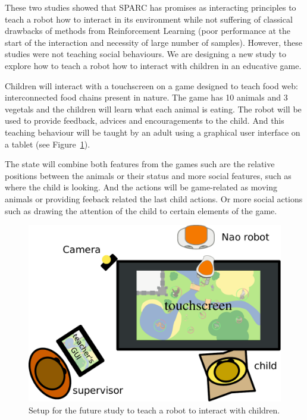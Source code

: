 \documentclass[conference]{IEEEtran}
\begin{document}
These two studies showed that SPARC has promises as interacting principles to
teach a robot how to interact in its environment while not suffering of
classical drawbacks of methods from Reinforcement Learning (poor performance at
the start of the interaction and necessity of large number of samples). However,
these studies were not teaching social behaviours. We are designing a new study
to explore how to teach a robot how to interact with children in an educative
game. 

Children will interact with a touchscreen on a game designed to teach food web:
interconnected food chains present in nature. The game has 10 animals and 3
vegetals and the children will learn what each animal is eating.
The robot will be used to provide feedback, advices and
encouragements to the child. And this teaching behaviour will be taught by an adult
using a graphical user interface on a tablet (see Figure~\ref{fig:setup}).

The state will combine both features from the games such are the relative
positions between the animals or their status and more social features, such as
where the child is looking. And the actions will be game-related as moving
animals or providing feeback related the last child actions. Or more social
actions such as drawing the attention of the child to certain elements of the
game.

\begin{figure}
    \centering
    \includegraphics[width=0.9\linewidth]{setup.pdf}
    \caption{Setup for the future study to teach a robot to interact with
    children.}
    \label{fig:setup}
\end{figure}
\end{document}
